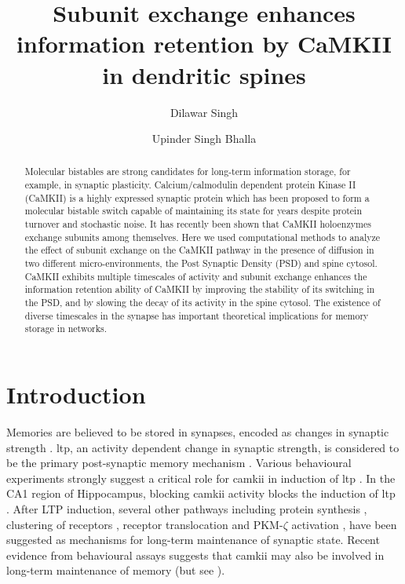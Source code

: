 \documentclass[9pt,lineno,doublespacing]{elife}
\title{Subunit exchange enhances information retention by CaMKII in dendritic spines}
\author[]{Dilawar Singh}
\author[]{Upinder Singh Bhalla}
\affil[]{National Centre for Biological Sciences Bangalore, Tata Institute of Fundamental Research}
\begin{document}
\maketitle

\begin{abstract}\label{abstract} 
Molecular bistables are strong candidates for long-term information storage, for
example, in synaptic plasticity. Calcium/calmodulin dependent protein Kinase II
(CaMKII) is a highly expressed synaptic protein which has been proposed to form
a molecular bistable switch capable of maintaining its state for years despite
protein turnover and stochastic noise. It has recently been shown that CaMKII
holoenzymes exchange subunits among themselves. Here we used computational
methods to analyze the effect of subunit exchange on the CaMKII pathway in the
presence of diffusion in two different micro-environments, the Post Synaptic
Density (PSD) and spine cytosol. CaMKII exhibits multiple timescales of activity
and subunit exchange enhances the information retention ability of CaMKII by
improving the stability of its switching in the PSD, and by slowing the decay of
its activity in the spine cytosol. The existence of diverse timescales in the
synapse has important theoretical implications for memory storage in networks.
\end{abstract}



\section{Introduction}\label{introduction}

Memories are believed to be stored in synapses, encoded as changes in synaptic
strength \citep{hebb_organization_2005,takeuchi_synaptic_2014,choi_interregional_2018}.
\gls{ltp}, an activity dependent change in synaptic strength, is considered to
be the primary post-synaptic memory mechanism
\citep{bliss_expression_2013,mayford_synapses_2012}. Various behavioural
experiments strongly suggest a critical role for \gls{camkii} in induction of
\gls{ltp} \citep{lucchesi_novel_2011,giese_autophosphorylation_1998}. In
the CA1 region of Hippocampus, blocking \gls{camkii} activity blocks the
induction of \gls{ltp} \citep{chang_camkii_2017}.  After LTP induction, several
other pathways including protein synthesis \citep{aslam_translational_2009},
clustering of receptors \citep{shouval_clusters_2005}, receptor translocation
\citep{hayer_molecular_2005} and PKM-$\zeta$ activation
\citep{sacktor_memory_2012}, have been suggested as mechanisms for long-term
maintenance of synaptic state. Recent evidence from behavioural assays suggests
that \gls{camkii} may also be involved in long-term maintenance of memory
\citep{rossetti_memory_2017} (but see \citep{chang_camkii_2017}).
\end{document}
